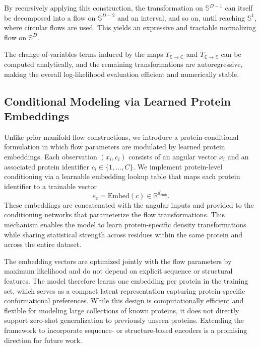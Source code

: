 \documentclass{article}
\begin{document}
By recursively applying this construction, the transformation on $\mathbb{S}^{D-1}$ can itself be decomposed into a flow on $\mathbb{S}^{D-2}$ and an interval, and so on, until reaching $\mathbb{S}^1$, where circular flows are used. This yields an expressive and tractable normalizing flow on $\mathbb{S}^D$.

The change-of-variables terms induced by the maps $T_{\mathbb{S} \to \mathbb{C}}$ and $T_{\mathbb{C} \to \mathbb{S}}$ can be computed analytically, and the remaining transformations are autoregressive, making the overall log-likelihood evaluation efficient and numerically stable.

\subsection{Conditional Modeling via Learned Protein Embeddings}
\label{sec:conditional_embeddings}

Unlike prior manifold flow constructions, we introduce a protein-conditional
formulation in which flow parameters are modulated by learned protein embeddings.
Each observation $(x_i, c_i)$ consists of an angular vector $x_i$ and an associated protein identifier $c_i \in \{1, \ldots, C\}$. We implement protein-level conditioning via a learnable embedding lookup table that maps each protein identifier to a trainable vector
\begin{equation}
e_c = \mathrm{Embed}(c) \in \mathbb{R}^{d_{\mathrm{emb}}}.
\end{equation}
These embeddings are concatenated with the angular inputs and provided to the conditioning networks that parameterize the flow transformations. This mechanism enables the model to learn protein-specific density transformations while sharing statistical strength across residues within the same protein and across the entire dataset.

The embedding vectors are optimized jointly with the flow parameters by maximum likelihood and do not depend on explicit sequence or structural features. The model therefore learns one embedding per protein in the training set, which serves as a compact latent representation capturing protein-specific conformational preferences. While this design is computationally efficient and flexible for modeling large collections of known proteins, it does not directly support zero-shot generalization to previously unseen proteins. Extending the framework to incorporate sequence- or structure-based encoders is a promising direction for future work.
\end{document}
